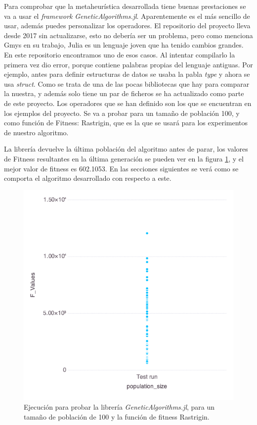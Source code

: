 Para comprobar que la metaheurística desarrollada tiene buenas prestaciones se va a usar el \emph{framework} \emph{GeneticAlgorithms.jl}. Aparentemente es el más sencillo de usar, 
además puedes personalizar los operadores. El repositorio del proyecto lleva desde 2017 sin actualizarse, esto no debería ser un problema, pero como menciona Gmys \cite{comparative_study}
en su trabajo, Julia es un lenguaje joven que ha tenido cambios grandes. En este repositorio encontramos uno de esos casos. Al intentar compilarlo la primera vez dio error, porque contiene
palabras propias del lenguaje antiguas. Por ejemplo, antes para definir estructuras de datos se usaba la pabla \emph{type} y ahora se usa \emph{struct}. Como se trata de una de las pocas 
bibliotecas que hay para comparar la nuestra, y además solo tiene un par de ficheros se ha actualizado como parte de este proyecto. Los operadores que se han definido son los que se
encuentran en los ejemplos del proyecto. Se va a probar para un tamaño de población 100, y como función de Fitness: Rastrigin, que es la que se usará para los experimentos de nuestro algoritmo.

La librería devuelve la última población del algoritmo antes de parar, los valores de Fitness resultantes en la última generación se pueden ver en la figura \ref{fig:genetic_algorithms_jl},
y el mejor valor de fitness es 602.1053. En las secciones siguientes se verá como se comporta el algoritmo desarrollado con respecto a este.

\begin{figure}[H]
	\centering	
	\includegraphics[scale=0.6]{../data/Plots/comparation.png}
	\caption{Ejecución para probar la librería \emph{GeneticAlgorithms.jl}, para un tamaño de población de 100 y la función de fitness Rastrigin.}
    \label{fig:genetic_algorithms_jl}
\end{figure}

